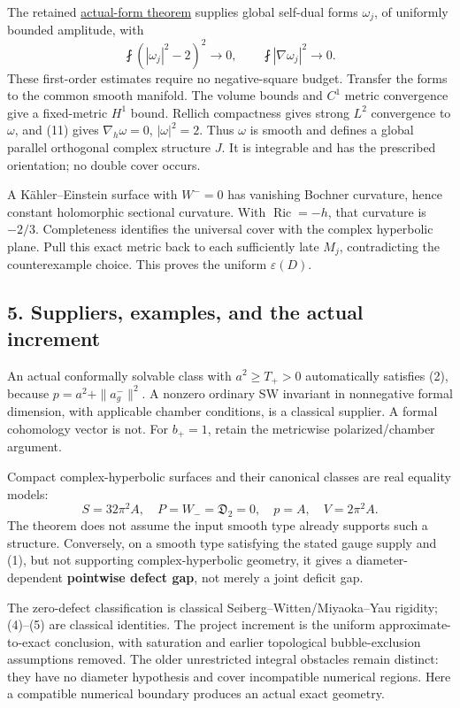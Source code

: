 \documentclass[
  11pt,
]{article}
\begin{document}
The retained
\href{../mathematics/current/line1_composed_application.md}{actual-form
theorem} supplies global self-dual forms \(\omega_j\), of uniformly
bounded amplitude, with \[
 \fint(|\omega_j|^2-2)^2\to0,\qquad
 \fint|\nabla\omega_j|^2\to0.                             \tag{11}
\] These first-order estimates require no negative-square budget.
Transfer the forms to the common smooth manifold. The volume bounds and
\(C^1\) metric convergence give a fixed-metric \(H^1\) bound. Rellich
compactness gives strong \(L^2\) convergence to \(\omega\), and (11)
gives \(\nabla_h\omega=0\), \(|\omega|^2=2\). Thus \(\omega\) is smooth
and defines a global parallel orthogonal complex structure \(J\). It is
integrable and has the prescribed orientation; no double cover occurs.

A Kähler--Einstein surface with \(W^-=0\) has vanishing Bochner
curvature, hence constant holomorphic sectional curvature. With
\(\operatorname{Ric}=-h\), that curvature is \(-2/3\). Completeness
identifies the universal cover with the complex hyperbolic plane. Pull
this exact metric back to each sufficiently late \(M_j\), contradicting
the counterexample choice. This proves the uniform \(\varepsilon(D)\).

\hypertarget{suppliers-examples-and-the-actual-increment}{%
\subsection{5. Suppliers, examples, and the actual
increment}\label{suppliers-examples-and-the-actual-increment}}

An actual conformally solvable class with \(a^2\ge T_+>0\) automatically
satisfies (2), because \(p=a^2+\|a_g^-\|^2\). A nonzero ordinary SW
invariant in nonnegative formal dimension, with applicable chamber
conditions, is a classical supplier. A formal cohomology vector is not.
For \(b_+=1\), retain the metricwise polarized/chamber argument.

Compact complex-hyperbolic surfaces and their canonical classes are real
equality models: \[
 S=32\pi^2A,\quad P=W_-=\mathfrak D_2=0,\quad p=A,\quad V=2\pi^2A.
\] The theorem does not assume the input smooth type already supports
such a structure. Conversely, on a smooth type satisfying the stated
gauge supply and (1), but not supporting complex-hyperbolic geometry, it
gives a diameter-dependent \textbf{pointwise defect gap}, not merely a
joint deficit gap.

The zero-defect classification is classical Seiberg--Witten/Miyaoka--Yau
rigidity; (4)--(5) are classical identities. The project increment is
the uniform approximate-to-exact conclusion, with saturation and earlier
topological bubble-exclusion assumptions removed. The older unrestricted
integral obstacles remain distinct: they have no diameter hypothesis and
cover incompatible numerical regions. Here a compatible numerical
boundary produces an actual exact geometry.
\end{document}
